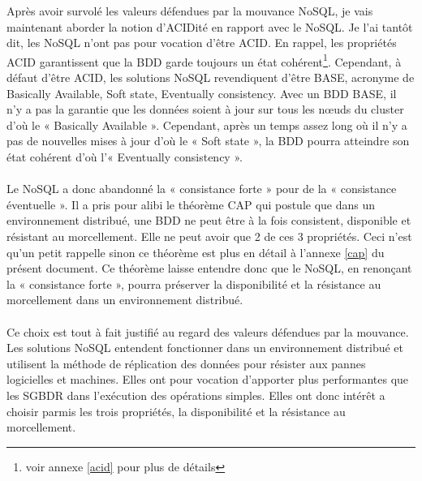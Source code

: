 Après avoir survolé les valeurs défendues par la
mouvance \textsf{NoSQL}, je vais maintenant aborder la notion
d'\textsf{ACIDité} en rapport avec le \textsf{NoSQL}. Je l'ai tantôt
dit, les \textsf{NoSQL} n'ont pas pour vocation
d'être \textsf{ACID}. En rappel, les propriétés \textsf{ACID}
garantissent que la \textsf{BDD} garde toujours un état
cohérent\footnote{voir annexe \ref{acid} pour plus de
détails}. Cependant, à défaut d'être \textsf{ACID}, les
solutions \textsf{NoSQL} revendiquent
d'être \textsf{BASE}\cite{RickCattell}, acronyme de \textsf{Basically
Available, Soft state, Eventually consistency}. Avec un \textsf{BDD
BASE}, il n'y a pas la garantie que les données soient à jour sur tous
les nœuds du cluster d'où le « \textsf{Basically Available}
». Cependant, après un temps assez long où il n'y a pas de nouvelles
mises à jour d'où le « \textsf{Soft state} », la \textsf{BDD} pourra
atteindre son état cohérent d'où l'« \textsf{Eventually consistency}
».
\\
\\
Le \textsf{NoSQL} a donc abandonné la « consistance forte » pour de la
« consistance éventuelle ». Il a pris pour alibi le
théorème \textsf{CAP} qui postule que dans un environnement distribué,
une \textsf{BDD} ne peut être à la fois consistent, disponible et
résistant au morcellement. Elle ne peut avoir que 2 de ces 3
propriétés. Ceci n'est qu'un petit rappelle sinon ce théorème est plus
en détail à l'annexe \ref{cap} du présent
document\cite{MichaelStonebraker2}. Ce théorème laisse entendre donc
que le \textsf{NoSQL}, en renonçant la « consistance forte », pourra
préserver la \textsf{disponibilité} et la \textsf{résistance au
morcellement} dans un environnement distribué.
\\
\\
Ce choix est tout à fait justifié au regard des valeurs défendues par
la mouvance. Les solutions \textsf{NoSQL} entendent fonctionner dans
un environnement distribué et utilisent la méthode de réplication des
données pour résister aux pannes logicielles et machines. Elles ont pour
vocation d'apporter plus performantes que les \textsf{SGBDR} dans
l'exécution des opérations simples. Elles ont donc intérêt a choisir
parmis les trois propriétés, la \textsf{disponibilité} et
la \textsf{résistance au morcellement}.
